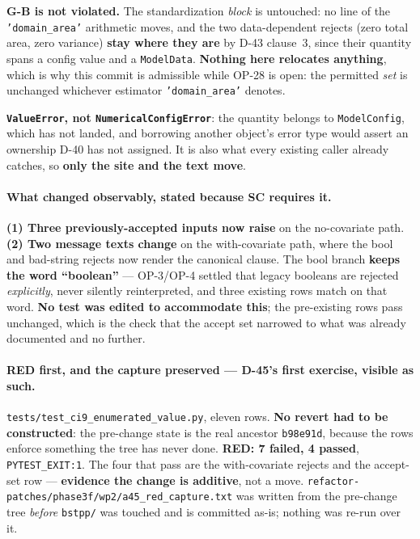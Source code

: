 \documentclass[
  10pt,
]{article}
\begin{document}
\textbf{G-B is not violated.} The standardization \emph{block} is untouched: no line of the \texttt{'domain\_area'} arithmetic moves, and the two data-dependent rejects (zero total area, zero variance) \textbf{stay where they are} by D-43 clause~3, since their quantity spans a config value and a \texttt{ModelData}. \textbf{Nothing here relocates anything}, which is why this commit is admissible while OP-28 is open: the permitted \emph{set} is unchanged whichever estimator \texttt{'domain\_area'} denotes.

\textbf{\texttt{ValueError}, not \texttt{NumericalConfigError}}: the quantity belongs to \texttt{ModelConfig}, which has not landed, and borrowing another object's error type would assert an ownership D-40 has not assigned. It is also what every existing caller already catches, so \textbf{only the site and the text move}.

\paragraph{What changed observably, stated because SC requires it.}
\textbf{(1) Three previously-accepted inputs now raise} on the no-covariate path. \textbf{(2) Two message texts change} on the with-covariate path, where the bool and bad-string rejects now render the canonical clause. The bool branch \textbf{keeps the word ``boolean''} --- OP-3/OP-4 settled that legacy booleans are rejected \emph{explicitly}, never silently reinterpreted, and three existing rows match on that word. \textbf{No test was edited to accommodate this}; the pre-existing rows pass unchanged, which is the check that the accept set narrowed to what was already documented and no further.

\paragraph{RED first, and the capture preserved --- D-45's first exercise, visible as such.}
\texttt{tests/\allowbreak{}test\_ci9\_enumerated\_value.py}, eleven rows. \textbf{No revert had to be constructed}: the pre-change state is the real ancestor \texttt{b98e91d}, because the rows enforce something the tree has never done. \textbf{RED: 7 failed, 4 passed}, \texttt{PYTEST\_EXIT:1}. The four that pass are the with-covariate rejects and the accept-set row --- \textbf{evidence the change is additive}, not a move. \texttt{refactor-patches/\allowbreak{}phase3f/wp2/\allowbreak{}a45\_red\_capture.txt} was written from the pre-change tree \emph{before} \texttt{bstpp/} was touched and is committed as-is; nothing was re-run over it.
\end{document}
